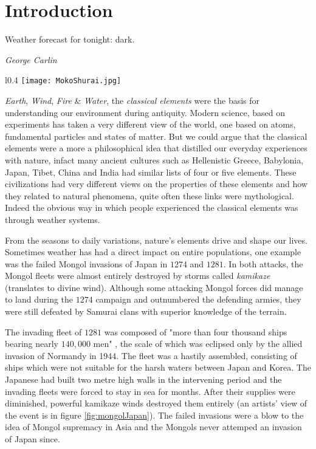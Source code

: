 \chapter{Introduction}\label{chapter:introduction}

\epigraph{Weather forecast for tonight: dark.}{\textit{George Carlin}}

\begin{wrapfigure}{l}{0.4\textwidth}
    \centering\texttt{[image: MokoShurai.jpg]}
    \caption{\small The Mongol fleet destroyed in a typhoon, ink and water on paper, by Kikuchi Y\={o}sai, 1847. 
    Source: Wikipedia}
    \label{fig:mongolJapan}
\end{wrapfigure}

\emph{Earth}, \emph{Wind}, \emph{Fire} \& \emph{Water}, the \emph{classical elements} were the basis 
for understanding our environment during antiquity. Modern science, based on experiments has taken a very 
different view of the world, one based on atoms, fundamental particles and states of matter. But we could 
argue that the classical elements were a more a philosophical idea that distilled our everyday experiences 
with nature, infact many ancient cultures such as Hellenistic Greece, Babylonia, Japan, Tibet, China and 
India had similar lists of four or five elements. These civilizations had very different views on the 
properties of these elements and how they related to natural phenomena, quite often these links 
were mythological. Indeed the obvious way in which people experienced the classical elements was through
weather systems. 

From the seasons to daily variations, nature's elements drive and shape our lives. Sometimes weather 
has had a direct impact on entire populations, one example was the failed Mongol invasions of Japan 
in $1274$ and $1281$. In both attacks, the Mongol fleets were almost entirely destroyed by storms called 
\emph{kamikaze} (translates to divine wind). Although some attacking Mongol forces did manage to land during 
the $1274$ campaign and outnumbered the defending armies, they were still defeated by Samurai clans with 
superior knowledge of the terrain. 

The invading fleet of $1281$ was composed of "more than four thousand ships bearing nearly $140,000$ men" 
\citep[pg.~17]{mcclain2002japan}, the scale of which was eclipsed only by the allied invasion of Normandy 
in 1944. The fleet was a hastily assembled, consisting of ships which were not suitable for the harsh waters 
between Japan and Korea. The Japanese had built two metre high walls in the intervening period and the invading 
fleets were forced to stay in sea for months. After their supplies were diminished, powerful kamikaze winds 
destroyed them entirely (an artists' view of the event is in figure \ref{fig:mongolJapan}). The failed invasions 
were a blow to the idea of Mongol supremacy in Asia and the Mongols never attemped an invasion of Japan since.

